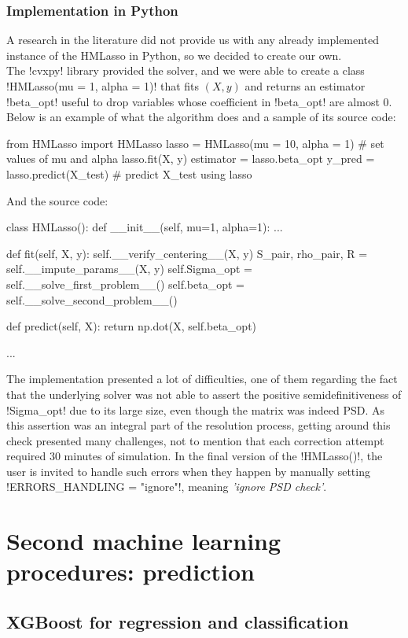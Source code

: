 \documentclass[]{article}
\begin{document}
\subsubsection{Implementation in Python}
A research in the literature did not provide us with any already implemented instance of the HMLasso in Python, so we decided to create our own.\\
The \pyth!cvxpy! library provided the solver, and we were able to create a class \pyth!HMLasso(mu = 1, alpha = 1)! that fits $(X, y)$ and returns an estimator \pyth!beta_opt! useful to drop variables whose coefficient in \pyth!beta_opt! are almost $0$. Below is an example of what the algorithm does and a sample of its source code:
\begin{python}
	from HMLasso import HMLasso
	lasso = HMLasso(mu = 10, alpha = 1) # set values of mu and alpha
	lasso.fit(X, y)
	estimator = lasso.beta_opt
	y_pred = lasso.predict(X_test) # predict X_test using lasso
\end{python}
And the source code:
\begin{python}
	class HMLasso():
		def __init__(self, mu=1, alpha=1):
		...
		
		def fit(self, X, y):
			self.__verify_centering__(X, y)
			S_pair, rho_pair, R = self.__impute_params__(X, y)
			self.Sigma_opt = self.__solve_first_problem__()
			self.beta_opt = self.__solve_second_problem__()
			
		def predict(self, X):
			return np.dot(X, self.beta_opt)
		
		...
\end{python}
The implementation presented a lot of difficulties, one of them regarding the fact that the underlying solver was not able to assert the positive semidefinitiveness of \pyth!Sigma_opt! due to its large size, even though the matrix was indeed PSD. As this assertion was an integral part of the resolution process, getting around this check presented many challenges, not to mention that each correction attempt required 30 minutes of simulation. In the final version of the \pyth!HMLasso()!, the user is invited to handle such errors when they happen by manually setting \pyth!ERRORS_HANDLING =  "ignore"!, meaning \textit{'ignore PSD check'}.

\section{Second machine learning procedures: prediction}
\subsection{XGBoost for regression and classification}
\end{document}
